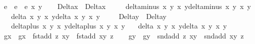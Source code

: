 \begin{isabellebody}
\ e{}\ \ {\isachardoublequoteopen}e{}\ {\isacharequal}\ e\ x{}\ y{}{\isachardoublequoteclose}\isanewline
\ \ \isamarkupfalse%
\ Delta\isactrlsub x\ \ {\isachardoublequoteopen}Delta\isactrlsub x\ {\isacharequal}\ \isanewline
\ \ \ {\isacharparenleft}delta{\isacharunderscore}minus\ x{}{\isacharprime}\ y{}{\isacharprime}\ x{}\ y{}{\isacharparenright}{\isacharasterisk}{\isacharparenleft}delta{\isacharunderscore}minus\ x{}\ y{}\ x{}{\isacharprime}\ y{}{\isacharprime}{\isacharparenright}{\isacharasterisk}\isanewline
\ \ \ {\isacharparenleft}delta\ x{}\ y{}\ x{}\ y{}{\isacharparenright}{\isacharasterisk}{\isacharparenleft}delta\ x{}\ y{}\ x{}\ y{}{\isacharparenright}{\isachardoublequoteclose}\ \isanewline
\ \ \isamarkupfalse%
\ Delta\isactrlsub y\ \ {\isachardoublequoteopen}Delta\isactrlsub y\ {\isacharequal}\isanewline
\ \ \ {\isacharparenleft}delta{\isacharunderscore}plus\ x{}{\isacharprime}\ y{}{\isacharprime}\ x{}\ y{}{\isacharparenright}{\isacharasterisk}{\isacharparenleft}delta{\isacharunderscore}plus\ x{}\ y{}\ x{}{\isacharprime}\ y{}{\isacharprime}{\isacharparenright}{\isacharasterisk}\isanewline
\ \ \ {\isacharparenleft}delta\ x{}\ y{}\ x{}\ y{}{\isacharparenright}{\isacharasterisk}{\isacharparenleft}delta\ x{}\ y{}\ x{}\ y{}{\isacharparenright}{\isachardoublequoteclose}\ \isanewline
\ \ \isamarkupfalse%
\ g\isactrlsub x\ \ {\isachardoublequoteopen}g\isactrlsub x\ {\isacharequal}\ fst{\isacharparenleft}add\ z{}{\isacharprime}\ {\isacharparenleft}x{}{\isacharcomma}y{}{\isacharparenright}{\isacharparenright}\ {\isacharminus}\ fst{\isacharparenleft}add\ {\isacharparenleft}x{}{\isacharcomma}y{}{\isacharparenright}\ z{}{\isacharprime}{\isacharparenright}{\isachardoublequoteclose}\isanewline
\ \ \isamarkupfalse%
\ g\isactrlsub y\ \ {\isachardoublequoteopen}g\isactrlsub y\ {\isacharequal}\ snd{\isacharparenleft}add\ z{}{\isacharprime}\ {\isacharparenleft}x{}{\isacharcomma}y{}{\isacharparenright}{\isacharparenright}\ {\isacharminus}\ snd{\isacharparenleft}add\ {\isacharparenleft}x{}{\isacharcomma}y{}{\isacharparenright}\ z{}{\isacharprime}{\isacharparenright}{\isachardoublequoteclose}\isanewline

\end{isabellebody}
